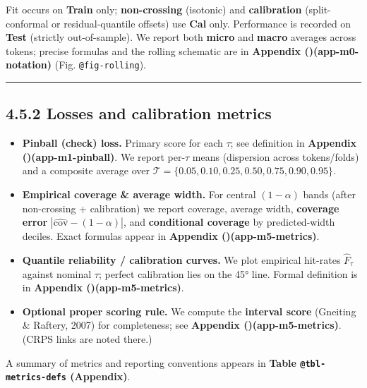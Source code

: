 \documentclass[
  a4paper,
  DIV=11,
  numbers=noendperiod]{scrreprt}
\begin{document}
Fit occurs on \textbf{Train} only; \textbf{non-crossing} (isotonic) and
\textbf{calibration} (split-conformal or residual-quantile offsets) use
\textbf{Cal} only. Performance is recorded on \textbf{Test} (strictly
out-of-sample). We report both \textbf{micro} and \textbf{macro}
averages across tokens; precise formulas and the rolling schematic are
in \textbf{Appendix
()(app-m0-notation)} (Fig.
\texttt{@fig-rolling}).

\begin{center}\rule{0.5\linewidth}{0.5pt}\end{center}

\subsection{4.5.2 Losses and calibration
metrics}\label{losses-and-calibration-metrics}

\begin{itemize}
\item
  \textbf{Pinball (check) loss.} Primary score for each \(\tau\); see
  definition in \textbf{Appendix
  ()(app-m1-pinball)}. We report
  per-\(\tau\) means (dispersion across tokens/folds) and a composite
  average over \(\mathcal T=\{0.05,0.10,0.25,0.50,0.75,0.90,0.95\}\).
\item
  \textbf{Empirical coverage \& average width.} For central
  \((1-\alpha)\) bands (after non-crossing + calibration) we report
  coverage, average width, \textbf{coverage error}
  \(|\widehat{\mathrm{cov}}-(1-\alpha)|\), and \textbf{conditional
  coverage} by predicted-width deciles. Exact formulas appear in
  \textbf{Appendix ()(app-m5-metrics)}.
\item
  \textbf{Quantile reliability / calibration curves.} We plot empirical
  hit-rates \(\widehat F_\tau\) against nominal \(\tau\); perfect
  calibration lies on the 45° line. Formal definition is in
  \textbf{Appendix ()(app-m5-metrics)}.
\item
  \textbf{Optional proper scoring rule.} We compute the \textbf{interval
  score} (Gneiting \& Raftery, 2007) for completeness; see
  \textbf{Appendix ()(app-m5-metrics)}.
  (CRPS links are noted there.)
\end{itemize}

A summary of metrics and reporting conventions appears in \textbf{Table
\texttt{@tbl-metrics-defs} (Appendix)}.
\end{document}
